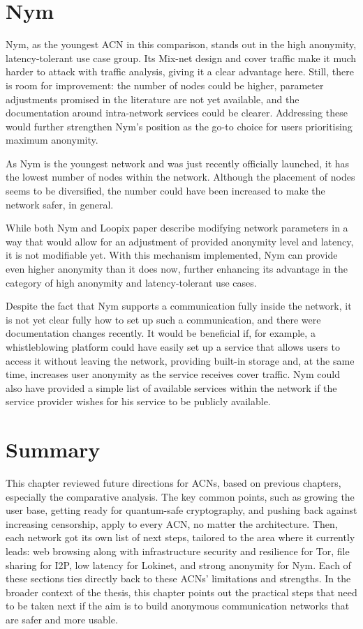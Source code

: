 \section{Nym}

Nym, as the youngest ACN in this comparison, stands out in the high anonymity, latency-tolerant use case group. Its Mix-net design and cover traffic make it much harder to attack with traffic analysis, giving it a clear advantage here. Still, there is room for improvement: the number of nodes could be higher, parameter adjustments promised in the literature are not yet available, and the documentation around intra-network services could be clearer. Addressing these would further strengthen Nym’s position as the go-to choice for users prioritising maximum anonymity.

As Nym is the youngest network and was just recently officially launched, it has the lowest number of nodes within the network. Although the placement of nodes seems to be diversified, the number could have been increased to make the network safer, in general.

While both Nym and Loopix paper describe modifying network parameters in a way that would allow for an adjustment of provided anonymity level and latency, it is not modifiable yet. With this mechanism implemented, Nym can provide even higher anonymity than it does now, further enhancing its advantage in the category of high anonymity and latency-tolerant use cases.

Despite the fact that Nym supports a communication fully inside the network, it is not yet clear fully how to set up such a communication, and there were documentation changes recently. It would be beneficial if, for example, a whistleblowing platform could have easily set up a service that allows users to access it without leaving the network, providing built-in storage and, at the same time, increases user anonymity as the service receives cover traffic. Nym could also have provided a simple list of available services within the network if the service provider wishes for his service to be publicly available.

\section{Summary}

This chapter reviewed future directions for ACNs, based on previous chapters, especially the comparative analysis. The key common points, such as growing the user base, getting ready for quantum-safe cryptography, and pushing back against increasing censorship, apply to every ACN, no matter the architecture. Then, each network got its own list of next steps, tailored to the area where it currently leads: web browsing along with infrastructure security and resilience for Tor, file sharing for I2P, low latency for Lokinet, and strong anonymity for Nym. Each of these sections ties directly back to these ACNs' limitations and strengths. In the broader context of the thesis, this chapter points out the practical steps that need to be taken next if the aim is to build anonymous communication networks that are safer and more usable.
